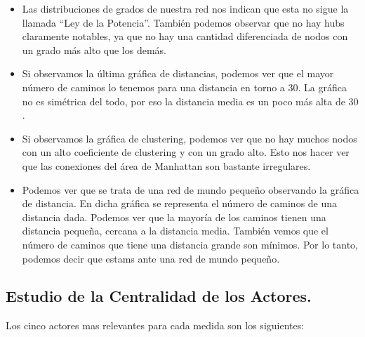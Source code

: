 \documentclass[11pt]{article}
\begin{document}
\begin{itemize}
	\item Las distribuciones de grados de nuestra red nos indican que esta no sigue la llamada ``Ley de la Potencia''. También podemos observar que no hay hubs claramente notables, ya que no hay una cantidad diferenciada de nodos con un grado más alto que los demás. 
	\item Si observamos la última gráfica de distancias, podemos ver que el mayor número de caminos lo tenemos para una distancia en torno a $30$. La gráfica no es simétrica del todo, por eso la distancia media es un poco más alta de $30$.
	\item Si observamos la gráfica de clustering, podemos ver que no hay muchos nodos con un alto coeficiente de clustering y con un grado alto. Esto nos hacer ver que las conexiones del área de Manhattan son bastante irregulares.
	\item Podemos ver que se trata de una red de mundo pequeño observando la gráfica de distancia. En dicha gráfica se representa el número de caminos de una distancia dada. Podemos ver que la mayoría de los caminos tienen una distancia pequeña, cercana a la distancia media. También vemos que el número de caminos que tiene una distancia grande son mínimos. Por lo tanto, podemos decir que estams ante una red de mundo pequeño.
\end{itemize}

\subsection{Estudio de la Centralidad de los Actores.}

Los cinco actores mas relevantes para cada medida son los siguientes:
\end{document}
